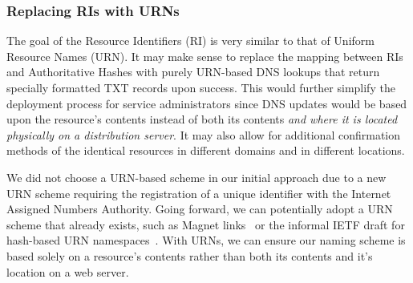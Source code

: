 \subsubsection{Replacing RIs with URNs}

The goal of the Resource Identifiers (RI) is very similar to that of Uniform
Resource Names (URN). It may make sense to replace the mapping between RIs and
Authoritative Hashes with purely URN-based DNS lookups that return specially
formatted TXT records upon success. This would further simplify the deployment
process for service administrators since DNS updates would be based upon the
resource's contents instead of both its contents \textit{and where it is located
physically on a distribution server}. It may also allow for additional
confirmation methods of the identical resources in different domains and in
different locations.

We did not choose a URN-based scheme in our initial approach due to a new URN
scheme requiring the registration of a unique identifier with the Internet
Assigned Numbers Authority. Going forward, we can potentially adopt a URN scheme
that already exists, such as Magnet links~\cite{MagnetLinks} or the informal
IETF draft for hash-based URN namespaces~\cite{draft-URN}. With URNs, we can
ensure our naming scheme is based solely on a resource's contents rather than
both its contents and it's location on a web server.
